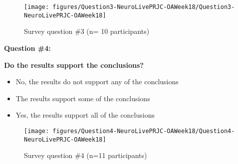 \documentclass[10pt]{article}
\providecommand{\tightlist}{\setlength{\itemsep}{0pt}\setlength{\parskip}{0pt}}%
\begin{document}
\par\null{}
\begin{figure}[h!]
\begin{center}
\texttt{[image: figures/Question3-NeuroLivePRJC-OAWeek18/Question3-NeuroLivePRJC-OAWeek18]}
\caption{{Survey question \#3 (n= 10 participants)
{\label{547306}}%
}}
\end{center}
\end{figure}

\textbf{Question \#4:}

\textbf{Do the results support the conclusions?}

\begin{itemize}
\tightlist
\item
  No, the results do not support any of the conclusions
\item
  The results support some of the conclusions
\item
  Yes, the results support all of the conclusions
\end{itemize}

\par\null{}
\begin{figure}[h!]
\begin{center}
\texttt{[image: figures/Question4-NeuroLivePRJC-OAWeek18/Question4-NeuroLivePRJC-OAWeek18]}
\caption{{Survey question \#4 (n=11 participants)
{\label{954383}}%
}}
\end{center}
\end{figure}

\FloatBarrier
\end{document}
